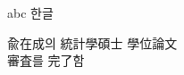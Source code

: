 \documentclass[12pt,a4paper,oneside]{book}
\begin{document}

abc
한글
 \begin{center}
 {\LARGE 兪在成의 統計學碩士 學位論文 \\ 審査를 完了함}
 \end{center}
 
 
\end{document}
